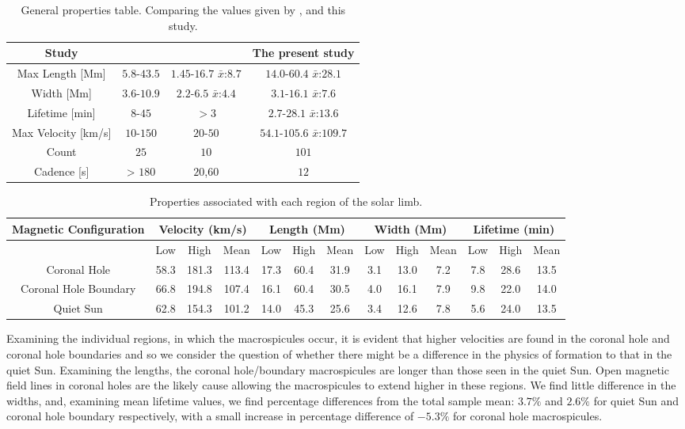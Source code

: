 \begin{table}[t!]
	\centering
	\begin{tabular}{c c c c}
		\hline\hline
		Study & \cite{Bohlin1975} & \cite{Dere89} & The present study \\    
		\hline                                
		Max Length [Mm] & $5.8$-$43.5$ & $1.45$-$16.7$ $\bar{x}$:$8.7$ & $14.0$-$60.4$ $\bar{x}$:$28.1$ \\
		Width [Mm] & $3.6$-$10.9$ & $2.2$-$6.5$ $\bar{x}$:$4.4$ & $3.1$-$16.1$ $\bar{x}$:$7.6$ \\
		Lifetime [min] & $8$-$45$ & $> 3$ & $2.7$-$28.1$ $\bar{x}$:$13.6$ \\
		Max Velocity [km/s] & $10$-$150$ & $20$-$50$ & $54.1$-$105.6$ $\bar{x}$:$109.7$ \\
		Count & $25$ & $10$ & $101$ \\
		Cadence [s] & > $180$ & $20$,$60$ & $12$ \\
		\hline 
	\end{tabular}
	\caption{General properties table. Comparing the values given by \cite{Bohlin1975}, \cite{Dere89} and this study.}
	\label{table:final properties}
\end{table}

\begin{table}[t!]
	\begin{center}
		\begin{tabular}{|c|c|c|c|c|c|c|c|c|c|c|c|c|}
			\hline 
			Magnetic Configuration & \multicolumn{3}{c|}{Velocity (km/s)} & \multicolumn{3}{c|}{Length (Mm)} & \multicolumn{3}{c|}{Width (Mm)} & \multicolumn{3}{c|}{Lifetime (min)}\tabularnewline
			\hline 
			\hline 
			& \multicolumn{1}{c|}{Low} & High & Mean & Low & High & Mean & \multicolumn{1}{c|}{Low} & High & Mean & Low & High & Mean\tabularnewline
			\hline 
			Coronal Hole & 58.3 & 181.3 & 113.4 & 17.3 & 60.4 & 31.9 & 3.1 & 13.0 & 7.2 & 7.8 & 28.6 & 13.5\tabularnewline
			\hline 
			Coronal Hole Boundary & 66.8 & 194.8 & 107.4 & 16.1 & 60.4 & 30.5 & 4.0 & 16.1 & 7.9 & 9.8 & 22.0 & 14.0\tabularnewline
			\hline 
			Quiet Sun & 62.8 & 154.3 & 101.2 & 14.0 & 45.3 & 25.6 & 3.4 & 12.6 & 7.8 & 5.6 & 24.0 & 13.5\tabularnewline
			\hline 
		\end{tabular}
		\caption{Properties associated with each region of the solar limb.}
	\end{center}
\end{table}


Examining the individual regions, in which the macrospicules occur, it is evident that higher velocities are found in the coronal hole and coronal hole boundaries and so we consider the question of whether there might be a difference in the physics of formation to that in the quiet Sun. Examining the lengths, the coronal hole/boundary macrospicules are longer than those seen in the quiet Sun. Open magnetic field lines in coronal holes are the likely cause allowing the macrospicules to extend higher in these regions. We find little difference in the widths, and, examining mean lifetime values, we find percentage differences from the total sample mean: $3.7\%$ and $2.6\%$ for quiet Sun and coronal hole boundary respectively, with a small increase in percentage difference of $-5.3\%$ for coronal hole macrospicules.

